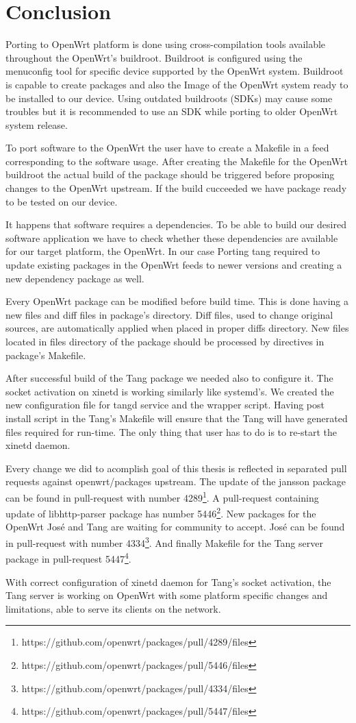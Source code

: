 \chapter{Conclusion}\label{conlusion}


Porting to OpenWrt platform is done using cross-compilation tools available throughout the OpenWrt's buildroot.
Buildroot is configured using the menuconfig tool for specific device supported by the OpenWrt system.
Buildroot is capable to create packages and also the Image of the OpenWrt system ready to be installed to our device.
Using outdated buildroots (SDKs) may cause some troubles but it is recommended to use an SDK while porting to older OpenWrt system release.

To port software to the OpenWrt the user have to create a Makefile in a feed corresponding to the software usage.
After creating the Makefile for the OpenWrt buildroot the actual build of the package should be triggered before proposing changes to the OpenWrt upstream.
If the build cucceeded we have package ready to be tested on our device.

It happens that software requires a dependencies.
To be able to build our desired software application we have to check whether these dependencies are available for our target platform, the OpenWrt.
In our case Porting tang required to update existing packages in the OpenWrt feeds to newer versions and creating a new dependency package as well.

Every OpenWrt package can be modified before build time.
This is done having a new files and diff files in package's directory.
Diff files, used to change original sources, are automatically applied when placed in proper diffs directory.
New files located in files directory of the package should be processed by directives in package's Makefile.

After successful build of the Tang package we needed also to configure it.
The socket activation on xinetd is working similarly like systemd's.
We created the new configuration file for tangd service and the wrapper script.
Having post install script in the Tang's Makefile will ensure that the Tang will have generated files required for run-time.
The only thing that user has to do is to re-start the xinetd daemon.

Every change we did to acomplish goal of this thesis is reflected in separated pull requests against openwrt/packages upstream.
The update of the jansson package can be found in pull-request with number 4289\footnote{https://github.com/openwrt/packages/pull/4289/files}.
A pull-request containing update of libhttp-parser package has number 5446\footnote{https://github.com/openwrt/packages/pull/5446/files}.
New packages for the OpenWrt José and Tang are waiting for community to accept.
José can be found in pull-request with number 4334\footnote{https://github.com/openwrt/packages/pull/4334/files}.
And finally Makefile for the Tang server package in pull-request 5447\footnote{https://github.com/openwrt/packages/pull/5447/files}.

With correct configuration of xinetd daemon for Tang's socket activation, the Tang server is working on OpenWrt with some platform specific changes and limitations, able to serve its clients on the network.
